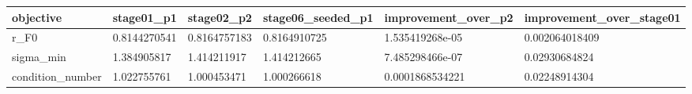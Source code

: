 \begin{tabular}{@{}llllll@{}}
\toprule
objective & stage01\_p1 & stage02\_p2 & stage06\_seeded\_p1 & improvement\_over\_p2 & improvement\_over\_stage01 \\
\midrule
r\_F0 & 0.8144270541 & 0.8164757183 & 0.8164910725 & 1.535419268e-05 & 0.002064018409 \\
sigma\_min & 1.384905817 & 1.414211917 & 1.414212665 & 7.485298466e-07 & 0.02930684824 \\
condition\_number & 1.022755761 & 1.000453471 & 1.000266618 & 0.0001868534221 & 0.02248914304 \\
\bottomrule
\end{tabular}
